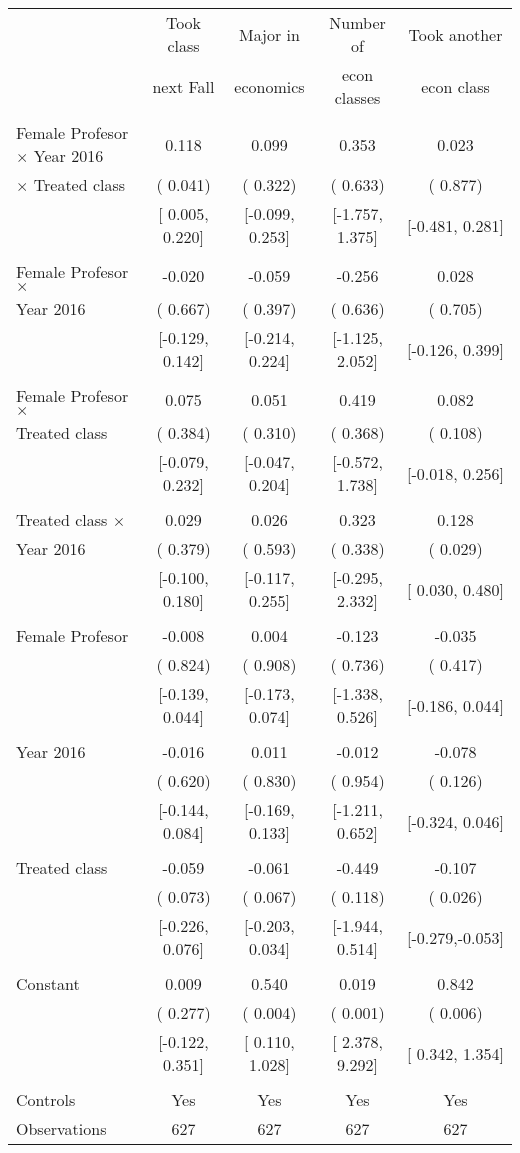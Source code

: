 \begin{tabular}{lcccc} \toprule
& Took class  & Major in & Number of  & Took another\tabularnewline
& next Fall  & economics  & econ classes & econ class \tabularnewline \midrule
&  &  &  & \tabularnewline
Female Profesor $\times$ Year 2016 &  0.118 &  0.099 &  0.353 &  0.023\tabularnewline
$\times$ Treated class  & ( 0.041) & ( 0.322) & ( 0.633) & ( 0.877)\tabularnewline
& {[} 0.005, 0.220{]} & {[}-0.099, 0.253{]} & {[}-1.757, 1.375{]} & {[}-0.481, 0.281{]}\tabularnewline
&  &  &  & \tabularnewline
Female Profesor $\times$  & -0.020 & -0.059 & -0.256 &  0.028\tabularnewline
Year 2016  & ( 0.667) & ( 0.397) & ( 0.636) & ( 0.705)\tabularnewline
& {[}-0.129, 0.142{]} & {[}-0.214, 0.224{]} & {[}-1.125, 2.052{]} & {[}-0.126, 0.399{]}\tabularnewline
&  &  &  & \tabularnewline
Female Profesor $\times$ &  0.075 &  0.051 &  0.419 &  0.082\tabularnewline
Treated class & ( 0.384) & ( 0.310) & ( 0.368) & ( 0.108)\tabularnewline
& {[}-0.079, 0.232{]} & {[}-0.047, 0.204{]} & {[}-0.572, 1.738{]} & {[}-0.018, 0.256{]}\tabularnewline
&  &  &  & \tabularnewline
Treated class $\times$ &  0.029 &  0.026 &  0.323 &  0.128\tabularnewline
Year 2016 & ( 0.379) & ( 0.593) & ( 0.338) & ( 0.029)\tabularnewline
& {[}-0.100, 0.180{]} & {[}-0.117, 0.255{]} & {[}-0.295, 2.332{]} & {[} 0.030, 0.480{]}\tabularnewline
&  &  &  & \tabularnewline
Female Profesor & -0.008 &  0.004 & -0.123 & -0.035\tabularnewline
& ( 0.824) & ( 0.908) & ( 0.736) & ( 0.417)\tabularnewline
& {[}-0.139, 0.044{]} & {[}-0.173, 0.074{]} & {[}-1.338, 0.526{]} & {[}-0.186, 0.044{]}\tabularnewline
&  &  &  & \tabularnewline
Year 2016 & -0.016 &  0.011 & -0.012 & -0.078\tabularnewline
& ( 0.620) & ( 0.830) & ( 0.954) & ( 0.126)\tabularnewline
& {[}-0.144, 0.084{]} & {[}-0.169, 0.133{]} & {[}-1.211, 0.652{]} & {[}-0.324, 0.046{]}\tabularnewline
&  &  &  & \tabularnewline
Treated class & -0.059 & -0.061 & -0.449 & -0.107\tabularnewline
& ( 0.073) & ( 0.067) & ( 0.118) & ( 0.026)\tabularnewline
& {[}-0.226, 0.076{]} & {[}-0.203, 0.034{]} & {[}-1.944, 0.514{]} & {[}-0.279,-0.053{]}\tabularnewline
&  &  &  & \tabularnewline
Constant  &  0.009 &  0.540 &  0.019 &  0.842\tabularnewline
& ( 0.277) & ( 0.004) & ( 0.001) & ( 0.006)\tabularnewline
& {[}-0.122, 0.351{]} & {[} 0.110, 1.028{]} & {[} 2.378, 9.292{]} & {[} 0.342, 1.354{]}\tabularnewline
&  &  &  & \tabularnewline
Controls & Yes & Yes & Yes & Yes \tabularnewline
Observations & 627 & 627 & 627 & 627\tabularnewline
\bottomrule \bottomrule
\end{tabular}
